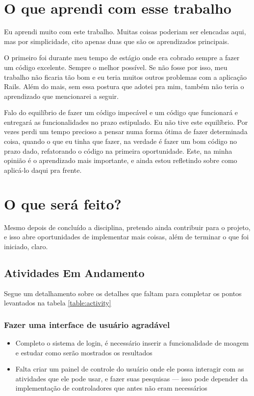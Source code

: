 \section{O que aprendi com esse trabalho}
\label{sec:lessions}

Eu aprendi muito com este trabalho. Muitas coisas poderiam ser elencadas aqui, mas por simplicidade, cito apenas duas que
são os aprendizados principais.

O primeiro foi durante meu tempo de estágio onde era cobrado sempre a fazer um código excelente. Sempre o melhor possível.
Se não fosse por isso, meu trabalho não ficaria tão bom e eu teria muitos outros problemas com a aplicação Rails. Além do
mais, sem essa postura que adotei pra mim, também não teria o aprendizado que mencionarei a seguir.

Falo do equilíbrio de fazer um código impecável e um código que funcionará e entregará as funcionalidades no prazo
estipulado. Eu não tive este equilíbrio. Por vezes perdi um tempo precioso a pensar numa forma ótima de fazer determinada
coisa, quando o que eu tinha que fazer, na verdade é fazer um bom código no prazo dado, refatorando o código na primeira
oportunidade. Este, na minha opinião é o aprendizado mais importante, e ainda estou refletindo sobre como aplicá-lo daqui
pra frente.

\section{O que será feito?}
\label{sec:what-will-be-done}

Mesmo depois de concluído a disciplina, pretendo ainda contribuir para o projeto, e isso abre oportunidades de implementar
mais coisas, além de terminar o que foi iniciado, claro.

\subsection{Atividades Em Andamento}\label{subsec:ongoing}

Segue um detalhamento sobre os detalhes que faltam para completar os pontos levantados na tabela \ref{table:activity}

\subsubsection{Fazer uma interface de usuário agradável}

\begin{itemize}
  \item Completo o sistema de login, é necessário inserir a funcionalidade de moagem e estudar como serão mostrados os
  resultados
  \item Falta criar um painel de controle do usuário onde ele possa interagir com as atividades que ele pode usar, e fazer
  suas pesquisas --- isso pode depender da implementação de controladores que antes não eram necessários
\end{itemize}

